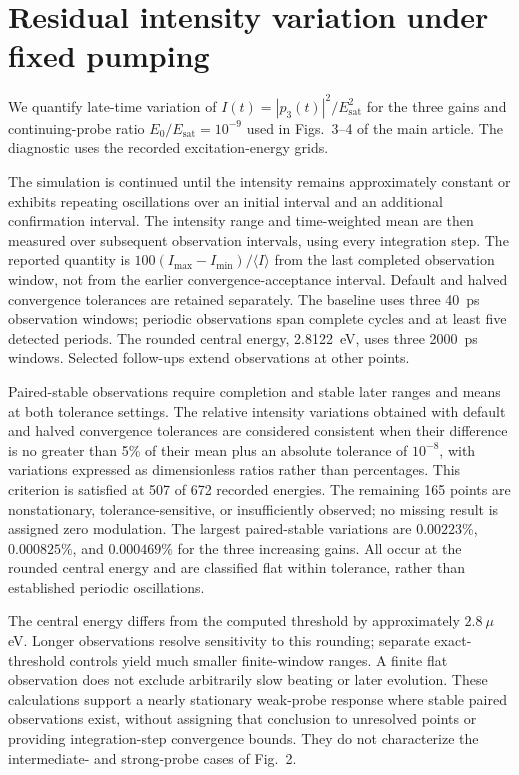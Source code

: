 \documentclass[9pt]{osa-supplemental-document}
\begin{document}
\section{Residual intensity variation under fixed pumping}
\label{sec:residual_modulation}
\begin{revision}
We quantify late-time variation of $I(t)=|p_3(t)|^2/E_{\mathrm{sat}}^2$ for the three gains and continuing-probe ratio $E_0/E_{\mathrm{sat}}=10^{-9}$ used in Figs.~3--4 of the main article. The diagnostic uses the recorded excitation-energy grids.

The simulation is continued until the intensity remains approximately constant or exhibits repeating oscillations over an initial interval and an additional confirmation interval. The intensity range and time-weighted mean are then measured over subsequent observation intervals, using every integration step. The reported quantity is $100(I_{\max}-I_{\min})/\langle I\rangle$ from the last completed observation window, not from the earlier convergence-acceptance interval. Default and halved convergence tolerances are retained separately. The baseline uses three 40~ps observation windows; periodic observations span complete cycles and at least five detected periods. The rounded central energy, 2.8122~eV, uses three 2000~ps windows. Selected follow-ups extend observations at other points.

Paired-stable observations require completion and stable later ranges and means at both tolerance settings. The relative intensity variations obtained with default and halved convergence tolerances are considered consistent when their difference is no greater than 5\% of their mean plus an absolute tolerance of $10^{-8}$, with variations expressed as dimensionless ratios rather than percentages. This criterion is satisfied at 507 of 672 recorded energies. The remaining 165 points are nonstationary, tolerance-sensitive, or insufficiently observed; no missing result is assigned zero modulation. The largest paired-stable variations are $0.00223\%$, $0.000825\%$, and $0.000469\%$ for the three increasing gains. All occur at the rounded central energy and are classified flat within tolerance, rather than established periodic oscillations.

The central energy differs from the computed threshold by approximately $2.8~\mu$eV. Longer observations resolve sensitivity to this rounding; separate exact-threshold controls yield much smaller finite-window ranges. A finite flat observation does not exclude arbitrarily slow beating or later evolution. These calculations support a nearly stationary weak-probe response where stable paired observations exist, without assigning that conclusion to unresolved points or providing integration-step convergence bounds. They do not characterize the intermediate- and strong-probe cases of Fig.~2.
\end{revision}
\end{document}
